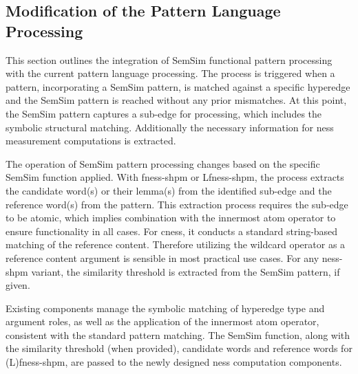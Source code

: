 \documentclass[11pt]{scrreprt}
\begin{document}
\subsection{Modification of the Pattern Language Processing}
\label{sec:modifications-pattern-language-processing}
This section outlines the integration of SemSim functional pattern processing with the current pattern language processing. The process is triggered when a pattern, incorporating a SemSim pattern, is matched against a specific hyperedge and the SemSim pattern is reached without any prior mismatches. At this point, the SemSim pattern captures a sub-edge for processing, which includes the symbolic structural matching. 
Additionally the necessary information for \gls{ness} measurement computations is extracted.

The operation of SemSim pattern processing changes based on the specific SemSim function applied. With \gls{fness-shpm} or L\gls{fness-shpm}, the process extracts the candidate word(s) or their lemma(s) from the identified sub-edge and the reference word(s) from the pattern. This extraction process requires the sub-edge to be atomic, which implies combination with the innermost atom operator to ensure functionality in all cases. For \gls{cness}, it conducts a standard string-based matching of the reference content. Therefore  utilizing the wildcard operator as a reference content argument is sensible in most practical use cases. For any \gls{ness-shpm} variant, the similarity threshold is extracted from the SemSim pattern, if given.

Existing components manage the symbolic matching of hyperedge type and argument roles, as well as the application of the innermost atom operator, consistent with the standard pattern matching. The SemSim function, along with the similarity threshold (when provided), candidate words and reference words for (L)\gls{fness-shpm}, are passed to the newly designed \gls{ness} computation components.
\end{document}
